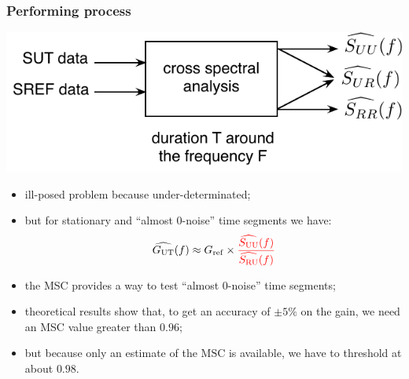 \documentclass[handout,9pt]{beamer}
\def\MSC{\text{MSC}}
\begin{document}
\begin{frame}
\frametitle{Performing process}

\begin{center}
\includegraphics[scale=0.6]{processdetail.pdf}
\end{center}

\begin{itemize}
\item
ill-posed problem because under-determinated;
\item
but for stationary and ``almost 0-noise'' time segments we have:
\begin{eqnarray*}
\widehat{G_{\mathrm{UT}}}(f)
\approx G_{\mathrm{ref}} \times
\color{red}\frac{\widehat{{S}_{\mathrm{UU}}}(f)}
                        {\widehat{{S}_{\mathrm{RU}}}(f)}
\end{eqnarray*}


\item
 the MSC provides a way to test ``almost 0-noise'' time segments;
\item
theoretical results show that, to get an accuracy of $\pm 5\%$ on the gain, we need an MSC value greater than $0.96$;
\item
but because only an estimate of the $\MSC$ is available, we have to threshold at about $0.98$. %
\end{itemize}


\end{frame}
\end{document}
